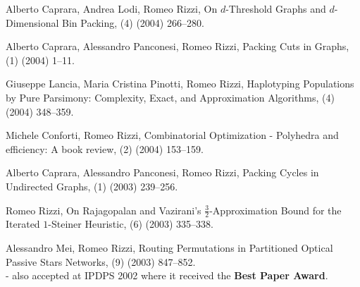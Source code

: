 \begin{etaremune}
  \item {\sc Alberto Caprara, Andrea Lodi, Romeo Rizzi},
   \newblock  On $d$-Threshold Graphs and $d$-Dimensional Bin Packing,
   (4) (2004) 266--280.

  \item {\sc Alberto Caprara, Alessandro Panconesi, Romeo Rizzi},
   \newblock  Packing Cuts in Graphs,
   (1) (2004) 1--11.

  \item {\sc Giuseppe Lancia, Maria Cristina Pinotti, Romeo Rizzi},
   \newblock  Haplotyping Populations by Pure Parsimony: Complexity, 
              Exact, and Approximation Algorithms,
   (4) (2004) 348--359.

  \item {\sc Michele Conforti, Romeo Rizzi},  
   \newblock  Combinatorial Optimization
              - Polyhedra and efficiency: A book review,
   (2) (2004) 153--159.

  \item {\sc Alberto Caprara, Alessandro Panconesi, Romeo Rizzi},
   \newblock  Packing Cycles in Undirected Graphs,
   (1) (2003) 239--256.

  \item {\sc Romeo Rizzi},
   \newblock  On Rajagopalan and Vazirani's $\frac{3}{2}$-Approximation
              Bound for the Iterated $1$-Steiner Heuristic,
   (6) (2003) 335--338.

  \item {\sc Alessandro Mei, Romeo Rizzi},
   \newblock  Routing Permutations in Partitioned Optical Passive Stars Networks,
   (9) (2003) 847--852.
   \newblock \\ - also accepted at IPDPS 2002 where it received the {\bf Best Paper Award}.


\end{etaremune}
